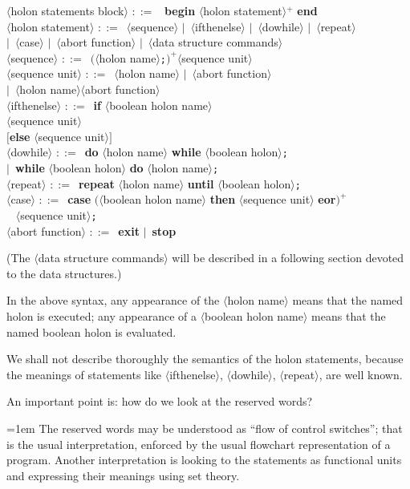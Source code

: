 \documentclass[openany,nobib]{tufte-book}
\newcommand{\kw}[1]{{\bf #1}}
\newcommand{\sym}[1]{$\langle$#1$\rangle$}
\def\is{$::=$\ }
\def\alt{$|$\ }
\begin{document}
\begin{tcolorbox}
\sym{holon statements block} \is
\kw{begin} \sym{holon statement}$^+$ \kw{end}\\
\sym{holon statement} \is \sym{sequence}
\alt \sym{ifthenelse}
\alt \sym{dowhile}
\alt \sym{repeat}\\
\qquad\alt \sym{case}
\alt \sym{abort function}
\alt \sym{data structure commands}\\
\sym{sequence} \is $($\sym{holon name}{\tt;}$)^+$\sym{sequence unit}\\
\sym{sequence unit} \is \sym{holon name} \alt \sym{abort function}\\
\qquad\alt\sym{holon name}\sym{abort function}\\
\sym{ifthenelse} \is \kw{if} \sym{boolean holon name} \\
\qquad\qquad\qquad\qquad\kw{then} \sym{sequence unit}\\
\qquad\qquad\qquad\qquad$[$\kw{else} \sym{sequence unit}$]$\\
\sym{dowhile} \is \kw{do} \sym{holon name} \kw{while} \sym{boolean
holon}{\tt;}\\
\qquad\alt \kw{while} \sym{boolean holon} \kw{do} \sym{holon name}{\tt;}\\
\sym{repeat} \is \kw{repeat} \sym{holon name} \kw{until} \sym{boolean
holon}{\tt;}\\
\sym{case} \is \kw{case} $($\sym{boolean holon name} \kw{then}
\sym{sequence unit} \kw{eor}$)^+$\\
\qquad\qquad\qquad\qquad\qquad\qquad\qquad\quad\ \phantom{\kw{case} }\kw{else}
\sym{sequence unit}{\tt;}\\
\sym{abort function} \is \kw{exit} \alt \kw{stop}
\end{tcolorbox}

(The \sym{data structure commands} will be described in a following section
devoted to the data structures.)

In the above syntax, any appearance of the \sym{holon name} means that the
named holon is executed; any appearance of a \sym{boolean holon name} means
that the named boolean holon is evaluated.

We shall not describe thoroughly the semantics of the holon statements, because
the meanings of statements like \sym{ifthenelse}, \sym{dowhile}, \sym{repeat},
are well known.

An important point is: how do we look at the reserved words?

{\emergencystretch=1em The reserved words may be understood as ``flow of
control switches''; that is
the usual interpretation, enforced by the usual flowchart representation of a
program. Another interpretation is looking to the statements as functional
units and expressing their meanings using set
theory.\autocite{mills1972mathematical}\par}
\end{document}
